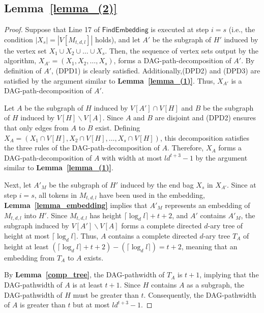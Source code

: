 \documentclass[runningheads]{llncs}
\theoremstyle{plain}
\theoremstyle{definition}
\begin{document}
\subsection{\textbf{Lemma~\ref{lemma_(2)}}}\label{appendix_D5}
\begin{proof}
    Suppose that Line 17 of $\mathsf{FindEmbedding}$ is executed at step $i=s$ (i.e., the condition $|X_s| = |V[M_{t, d, l}]|$ holds),
    and let $A'$ be the subgraph of $H'$ induced by the vertex set $X_1 \cup X_2 \cup \dots \cup X_s$. Then, the sequence of vertex sets output by the algorithm, $X_{A'} = (X_1, X_2, \dots , X_s)$, forms a DAG-path-decomposition of $A'$. By definition of $A'$, (DPD1) is clearly satisfied. Additionally,(DPD2) and (DPD3) are satisfied by the argument similar to \textbf{Lemma~\ref{lemma_(1)}}. Thus, $X_{A'}$ is a DAG-path-decomposition of $A'$.

    Let $A$ be the subgraph of $H$ induced by $V[A'] \cap V[H]$ and $B$ be the subgraph of $H$ induced by $V[H] \backslash V[A]$. Since $A$ and $B$ are disjoint and (DPD2) ensures that only edges from $A$ to $B$ exist. Defining $X_A = (X_1 \cap V[H], X_2 \cap V[H], \dots , X_s \cap V[H])$, this decomposition satisfies the three rules of the DAG-path-decomposition of $A$. Therefore, $X_A$ forms a DAG-path-decomposition of $A$ with width at most $ld^{t+3}-1$ by the argument similar to \textbf{Lemma~\ref{lemma_(1)}}.

    Next, let $A'_M$ be the subgraph of $H'$ induced by the end bag $X_s$ in $X_{A'}$. Since at step $i=s$, all tokens in $M_{t, d, l}$ have been used in the embedding, \textbf{Lemma~\ref{lemma_embedding}} implies that $A'_M$ represents an embedding of $M_{t, d, l}$ into $H'$. Since $M_{t, d, l}$ has height $\lceil \log_d l \rceil +t+2$, and $A'$ contains $A'_M$, the subgraph induced by $V[A'] \backslash V[A]$ forms a complete directed $d$-ary tree of height at most $\lceil \log_d l \rceil$. Thus, $A$ contains a complete directed $d$-ary tree $T_A$ of height at least $(\lceil \log_d l \rceil +t+2) - (\lceil \log_d l \rceil) = t+2$, meaning that an embedding from $T_A$ to $A$ exists. 

    By \textbf{Lemma~\ref{comp_tree}}, the DAG-pathwidth of $T_A$ is $t+1$, implying that the DAG-pathwidth of $A$ is at least $t+1$. Since $H$ contains $A$ as a subgraph, the DAG-pathwidth of $H$ must be greater than $t$. Consequently, the DAG-pathwidth of $A$ is greater than $t$ but at most $ld^{t+3}-1$.
\end{proof}
\end{document}
